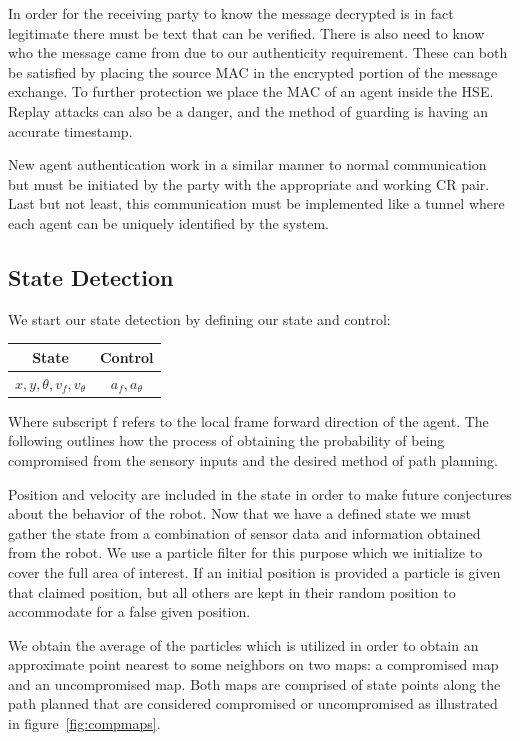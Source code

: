 \documentclass[conference]{IEEEtran}
\begin{document}
In order for the receiving party to know the message decrypted is in fact legitimate there must be text that can be verified. There is also need to know who the message came from due to our authenticity requirement. These can both be satisfied by placing the source MAC in the encrypted portion of the message exchange. To further protection we place the MAC of an agent inside the HSE. Replay attacks can also be a danger, and the method of guarding is having an accurate timestamp.
	
New agent authentication work in a similar manner to normal communication but must be initiated by the party with the appropriate and working CR pair. Last but not least, this communication must be implemented like a tunnel where each agent can be uniquely identified by the system.

\subsection{State Detection}

We start our state detection by defining our state and control:

\begin{table}[]
\label{table_example}
\begin{center}
\begin{tabular}{|c|c|}
\hline
State & Control\\
\hline
$x,y,\theta,v_f,v_\theta$ & $a_f,a_\theta$\\
\hline
\end{tabular}
\end{center}
\end{table}

Where subscript f refers to the local frame forward direction of the agent. The following outlines how the process of obtaining the probability of being compromised from the sensory inputs and the desired method of path planning.

Position and velocity are included in the state in order to make future conjectures about the behavior of the robot. Now that we have a defined state we must gather the state from a combination of sensor data and information obtained from the robot. We use a particle filter for this purpose which we initialize to cover the full area of interest. If an initial position is provided a particle is given that claimed position, but all others are kept in their random position to accommodate for a false given position.
	
We obtain the average of the particles  which is utilized in order to obtain an approximate point nearest to some neighbors on two maps: a compromised map and an uncompromised map. Both maps are comprised of state points along the path planned that are considered compromised or uncompromised as illustrated in figure~\ref{fig:compmaps}.
	
\end{document}
